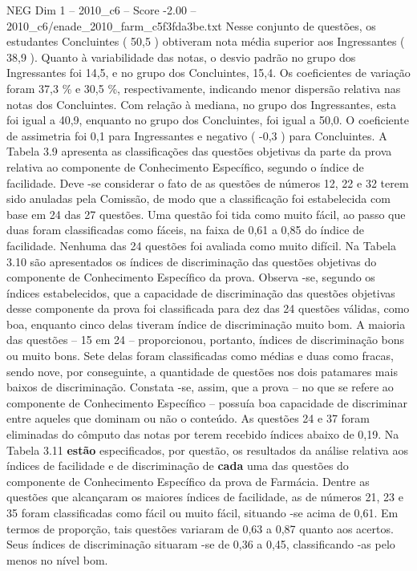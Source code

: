 \begin{textsample}{NEG Dim 1 – 2010\_c6 – Score -2.00 – 2010\_c6/enade\_2010\_farm\_c5f3fda3be.txt}
Nesse conjunto de questões, os estudantes Concluintes ( 50,5 ) obtiveram nota média superior aos Ingressantes ( 38,9 ).
Quanto à variabilidade das notas, o desvio padrão no grupo dos Ingressantes foi 14,5, e no grupo dos Concluintes, 15,4.
Os coeficientes de variação foram 37,3 \% e 30,5 \%, respectivamente, indicando menor dispersão relativa nas notas dos Concluintes.
Com relação à mediana, no grupo dos Ingressantes, esta foi igual a 40,9, enquanto no grupo dos Concluintes, foi igual a 50,0.
O coeficiente de assimetria foi 0,1 para Ingressantes e negativo ( -0,3 ) para Concluintes.
A Tabela 3.9 apresenta as classificações das questões objetivas da parte da prova relativa ao componente de Conhecimento Específico, segundo o índice de facilidade.
Deve -se considerar o fato de as questões de números 12, 22 e 32 terem sido anuladas pela Comissão, de modo que a classificação foi estabelecida com base em 24 das 27 questões.
Uma questão foi tida como muito fácil, ao passo que duas foram classificadas como fáceis, na faixa de 0,61 a 0,85 do índice de facilidade.
Nenhuma das 24 questões foi avaliada como muito difícil.
Na Tabela 3.10 são apresentados os índices de discriminação das questões objetivas do componente de Conhecimento Específico da prova.
Observa -se, segundo os índices estabelecidos, que a capacidade de discriminação das questões objetivas desse componente da prova foi classificada para dez das 24 questões válidas, como boa, enquanto cinco delas tiveram índice de discriminação muito bom.
A maioria das questões – 15 em 24 – proporcionou, portanto, índices de discriminação bons ou muito bons.
Sete delas foram classificadas como médias e duas como fracas, sendo nove, por conseguinte, a quantidade de questões nos dois patamares mais baixos de discriminação.
Constata -se, assim, que a prova – no que se refere ao componente de Conhecimento Específico – possuía boa capacidade de discriminar entre aqueles que dominam ou não o conteúdo.
As questões 24 e 37 foram eliminadas do cômputo das notas por terem recebido índices abaixo de 0,19.
Na Tabela 3.11 \textbf{estão} especificados, por questão, os resultados da análise relativa aos índices de facilidade e de discriminação de \textbf{cada} uma das questões do componente de Conhecimento Específico da prova de Farmácia.
Dentre as questões que alcançaram os maiores índices de facilidade, as de números 21, 23 e 35 foram classificadas como fácil ou muito fácil, situando -se acima de 0,61.
Em termos de proporção, tais questões variaram de 0,63 a 0,87 quanto aos acertos.
Seus índices de discriminação situaram -se de 0,36 a 0,45, classificando -as pelo menos no nível bom.

\end{textsample}

